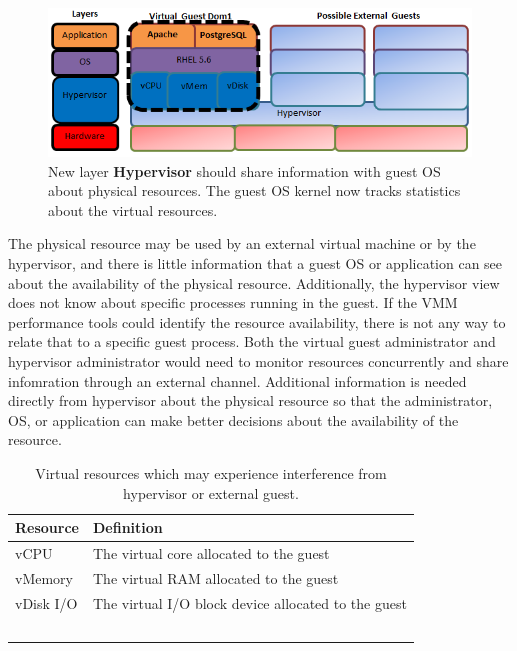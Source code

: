 \begin{figure}[!h]
  \begin{center}
  \includegraphics[width=6in]{images/LayersVirtual.png}
  \caption{New layer \textbf{Hypervisor} should share information with guest OS about physical resources.  The guest OS kernel now tracks statistics about the virtual resources.}
  \label{LayersAndResources}
  \end{center}
\end{figure}

The physical resource may be used by an external virtual machine or by the hypervisor, and there is little information that a guest OS or application can see about the availability of the physical resource.
Additionally, the hypervisor view does not know about specific processes running in the guest.  If the VMM performance tools could identify the resource availability, there is not any way to relate that to a specific guest process.  Both the virtual guest administrator and hypervisor administrator would need to monitor resources concurrently and share infomration through an external channel. 
Additional information is needed directly from hypervisor about the physical resource so that the administrator, OS, or application can make better decisions about the availability of the resource. 

\begin{table}[h]
  \begin{tabular}{ l p{10cm} }
    Resource & Definition \\
    \hline
    vCPU & The virtual core allocated to the guest \\
    vMemory & The virtual RAM allocated to the guest \\
    vDisk I/O & The virtual I/O block device allocated to the guest \\
    \hline
  \end{tabular}
\caption{Virtual resources which may experience interference from hypervisor or external guest.}
\label{tab:resources}
\end{table}

